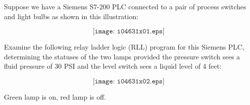 

Suppose we have a Siemens S7-200 PLC connected to a pair of process switches and light bulbs as shown in this illustration:

$$\texttt{[image: i04631x01.eps]}$$

Examine the following relay ladder logic (RLL) program for this Siemens PLC, determining the statuses of the two lamps provided the pressure switch sees a fluid pressure of 30 PSI and the level switch sees a liquid level of 4 feet:

$$\texttt{[image: i04631x02.eps]}$$







Green lamp is on, red lamp is off.











